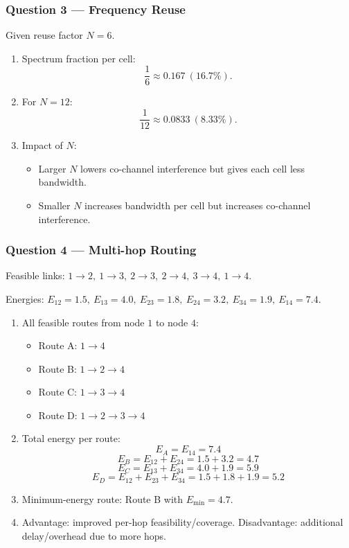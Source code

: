 \documentclass[11pt,a4paper]{article}
\begin{document}
\subsubsection*{Question 3 --- Frequency Reuse}
Given reuse factor $N=6$.

\begin{enumerate}[label=\alph*.]
    \item Spectrum fraction per cell:
    \[
    \frac{1}{6}\approx 0.167\ (16.7\%).
    \]
    \item For $N=12$:
    \[
    \frac{1}{12}\approx 0.0833\ (8.33\%).
    \]
    \item Impact of $N$:
    \begin{itemize}
        \item Larger $N$ lowers co-channel interference but gives each cell less bandwidth.
        \item Smaller $N$ increases bandwidth per cell but increases co-channel interference.
    \end{itemize}
    
\end{enumerate}

\subsubsection*{Question 4 --- Multi-hop Routing}
Feasible links: $1\to 2,\ 1\to 3,\ 2\to 3,\ 2\to 4,\ 3\to 4,\ 1\to 4$.

Energies: $E_{12}=1.5,\ E_{13}=4.0,\ E_{23}=1.8,\ E_{24}=3.2,\ E_{34}=1.9,\ E_{14}=7.4$.

\begin{enumerate}[label=\alph*.]
    \item All feasible routes from node $1$ to node $4$:
    \begin{itemize}
        \item Route A: $1\to 4$
        \item Route B: $1\to 2\to 4$
        \item Route C: $1\to 3\to 4$
        \item Route D: $1\to 2\to 3\to 4$
    \end{itemize}
    \item Total energy per route:
    \[
    E_A=E_{14}=7.4
    \]
    \[
    E_B=E_{12}+E_{24}=1.5+3.2=4.7
    \]
    \[
    E_C=E_{13}+E_{34}=4.0+1.9=5.9
    \]
    \[
    E_D=E_{12}+E_{23}+E_{34}=1.5+1.8+1.9=5.2
    \]
    \item Minimum-energy route: Route B with $E_{\min}=4.7$.
    \item Advantage: improved per-hop feasibility/coverage. Disadvantage: additional delay/overhead due to more hops.
\end{enumerate}
\end{document}
